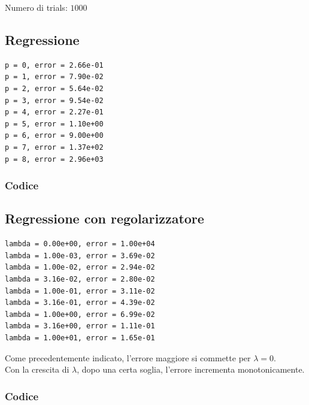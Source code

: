 \documentclass[12pt]{article}
\begin{document}
Numero di trials: $1000$

\subsection{Regressione}

\begin{verbatim}
p = 0, error = 2.66e-01
p = 1, error = 7.90e-02
p = 2, error = 5.64e-02
p = 3, error = 9.54e-02
p = 4, error = 2.27e-01
p = 5, error = 1.10e+00
p = 6, error = 9.00e+00
p = 7, error = 1.37e+02
p = 8, error = 2.96e+03
\end{verbatim}

\subsubsection{Codice}


\newpage
\subsection{Regressione con regolarizzatore}

\begin{verbatim}
lambda = 0.00e+00, error = 1.00e+04
lambda = 1.00e-03, error = 3.69e-02
lambda = 1.00e-02, error = 2.94e-02
lambda = 3.16e-02, error = 2.80e-02
lambda = 1.00e-01, error = 3.11e-02
lambda = 3.16e-01, error = 4.39e-02
lambda = 1.00e+00, error = 6.99e-02
lambda = 3.16e+00, error = 1.11e-01
lambda = 1.00e+01, error = 1.65e-01
\end{verbatim}
Come precedentemente indicato, l'errore maggiore si commette per
$\lambda=0$. \\
Con la crescita di $\lambda$, dopo una certa soglia, l'errore incrementa monotonicamente.

\subsubsection{Codice}

\end{document}
